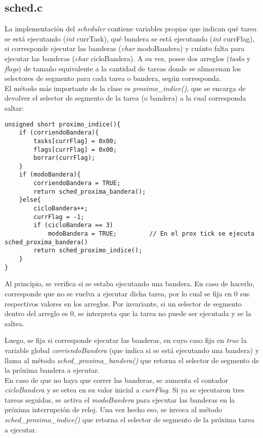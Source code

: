 \documentclass[a4paper]{article}
\newenvironment{codesnippet}{%
	\begin{Sbox}\begin{minipage}{\textwidth}\sffamily\small}%
	{\end{minipage}\end{Sbox}%
		\begin{center}%
		\vspace{-0.4cm}\colorbox{litegrey}{\TheSbox}\end{center}\vspace{0.3cm}}
\begin{document}
\subsection{sched.c}
La implementación del \textit{scheduler} contiene variables propias que indican qué tarea se está ejecutando (\textit{int} currTask), qué bandera se está ejecutando (\textit{int} currFlag), si corresponde ejecutar las banderas (\textit{char} modoBandera) y cuánto falta para ejecutar las banderas (\textit{char} cicloBandera). A su vez, posee dos arreglos (\textit{tasks} y \textit{flags}) de tamaño equivalente a la cantidad de tareas donde se almacenan los selectores de segmento para cada tarea o bandera, según corresponda.
\\

El método más importante de la clase es \textit{proximo_indice()}, que se encarga de devolver el selector de segmento de la tarea (o bandera) a la cual corresponda saltar:
\begin{codesnippet}
\begin{verbatim}
unsigned short proximo_indice(){
    if (corriendoBandera){
        tasks[currFlag] = 0x00;
        flags[currFlag] = 0x00;
        borrar(currFlag);
    }
    if (modoBandera){
        corriendoBandera = TRUE;
        return sched_proxima_bandera();
    }else{
        cicloBandera++; 
        currFlag = -1;					
        if (cicloBandera == 3)
            modoBandera = TRUE;			// En el prox tick se ejecuta sched_proxima_bandera()
        return sched_proximo_indice();
    }
}
\end{verbatim}
\end{codesnippet}

Al principio, se verifica si se estaba ejecutando una bandera. En caso de hacerlo, corresponde que no se vuelva a ejecutar dicha tarea, por lo cual se fija en 0 sus respectivos valores en los arreglos. Por invariante, si un selector de segmento dentro del arreglo es 0, se interpreta que la tarea no puede ser ejecutada y se la saltea.

Luego, se fija si corresponde ejecutar las banderas, en cuyo caso fija en \textit{true} la variable global \textit{corriendoBandera} (que indica si se está ejecutando una bandera) y llama al método \textit{sched_proxima_bandera()} que retorna el selector de segmento de la próxima bandera a ejecutar.
\\

En caso de que no haya que correr las banderas, se aumenta el contador \textit{cicloBandera} y se setea en su valor inicial a \textit{currFlag}. Si ya se ejecutaron tres tareas seguidas, se activa el \textit{modoBandera} para ejecutar las banderas en la próxima interrupción de reloj. Una vez hecho eso, se invoca al método \textit{sched_proximo_indice()} que retorna el selector de segmento de la próxima tarea a ejecutar.
\end{document}

